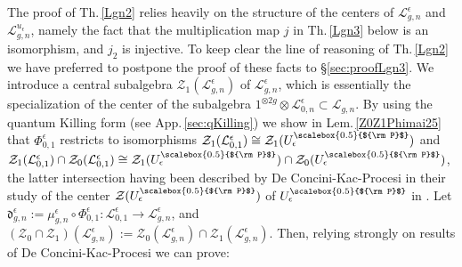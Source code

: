 \documentclass[11pt]{amsart}
\newcommand{\e}{\epsilon}
\newcommand{\Ll}{\mathcal{L}}
\newcommand{\Pup}{{\scalebox{0.5}{${\rm P}$}}}
\begin{document}
The proof of Th.\,\ref{Lgn2} relies heavily on the structure of the centers of $\Ll_{g,n}^\e$ and $\Ll_{g,n}^{u_\e}$, namely the fact that the multiplication map $j$ in Th.\,\ref{Lgn3} below is an isomorphism, and $j_2$ is injective. To keep clear the line of reasoning of Th.\,\ref{Lgn2} we have preferred to postpone the proof of these facts to \S \ref{sec:proofLgn3}. We introduce a central subalgebra $\mathcal{Z}_1(\mathcal{L}_{g,n}^{\e}) $ of $\Ll_{g,n}^{\e}$, which is essentially the specialization of the center of the subalgebra $1^{\otimes 2g} \otimes \mathcal{L}_{0,n}^{\e} \subset \Ll_{g,n}$. By using the quantum Killing form (see App.\,\ref{sec:qKilling}) we show in Lem.\,\ref{Z0Z1Phimai25} that $\Phi_{0,1}^\e$ restricts to  isomorphisms $\mathcal{Z}_1(\Ll_{0,1}^\e) \cong \mathcal{Z}_1(U_\e^\Pup)$ and $\mathcal{Z}_1(\Ll_{0,1}^\e) \cap \mathcal{Z}_0(\Ll_{0,1}^\e) \cong \mathcal{Z}_1(U_\e^\Pup) \cap \mathcal{Z}_0(U_\e^\Pup)$, the latter intersection having been described by De Concini-Kac-Procesi in their study of the center $\mathcal{Z}(U_\e^\Pup)$ of $U_\e^\Pup$ in \cite{DC-K-P1,DCP}. Let $\mathfrak{d}_{g,n}^{\e} := \mu_{g,n}^\e \circ \Phi_{0,1}^\e : \Ll_{0,1}^\e \to \Ll_{g,n}^{\e}$, and $(\mathcal{Z}_0 \cap \mathcal{Z}_1)(\mathcal{L}_{g,n}^{\e}) := \mathcal{Z}_0(\mathcal{L}_{g,n}^{\e}) \cap \mathcal{Z}_1(\mathcal{L}_{g,n}^{\e})$. Then, relying strongly on results of De Concini-Kac-Procesi we can prove:
\end{document}
